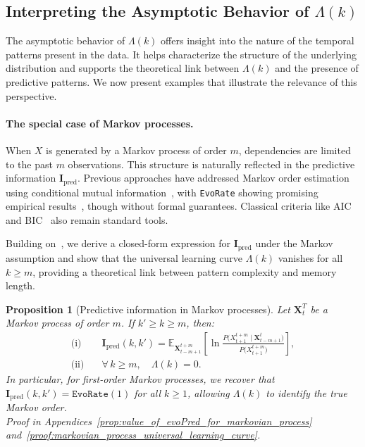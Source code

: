 \documentclass{article}
\newtheorem{proposition}[theorem]{Proposition}
\begin{document}
\subsection{Interpreting the Asymptotic Behavior of $\Lambda(k)$}

The asymptotic behavior of $\Lambda(k)$ offers insight into the nature of the temporal patterns present in the data. It helps characterize the structure of the underlying distribution and supports the theoretical link between $\Lambda(k)$ and the presence of predictive patterns. We now present examples that illustrate the relevance of this perspective.

\paragraph{The special case of Markov processes.}

When \( X \) is generated by a Markov process of order \( m \), dependencies are limited to the past \( m \) observations. This structure is naturally reflected in the predictive information \( \mathbf{I}_{\text{pred}} \). Previous approaches have addressed Markov order estimation using conditional mutual information~\cite{papapetrou2013markov}, with \texttt{EvoRate} showing promising empirical results~\cite{zeng2025towards}, though without formal guarantees. Classical criteria like AIC~\cite{katz1981some} and BIC~\cite{csiszar2000consistency} also remain standard tools.

Building on~\citet{crutchfield2003regularities}, we derive a closed-form expression for \( \mathbf{I}_{\text{pred}} \) under the Markov assumption and show that the universal learning curve \( \Lambda(k) \) vanishes for all \( k \geq m \), providing a theoretical link between pattern complexity and memory length.

\begin{proposition}[Predictive information in Markov processes]\label{prop:markov_combined}
Let $\mathbf{X}_{t}^{T}$ be a Markov process of order $m$. If $k' \geq k \geq m$, then:
\begin{align*}
  \text{(i)}\quad & \mathbf{I}_{\text{pred}}(k,k')
  = \mathbb{E}_{\mathbf{X}_{t-m+1}^{t+m}}
  \left[\ln\frac{P\bigl(X_{t+1}^{t+m}\mid\mathbf{X}_{t-m+1}^t\bigr)}
                {P\bigl(X_{t+1}^{t+m}\bigr)}\right], \\[6pt]
  \text{(ii)}\quad & \forall\,k\ge m,\quad \Lambda(k) = 0.
\end{align*}
In particular, for first-order Markov processes, we recover that $\mathbf{I}_{\text{pred}}(k, k') = \texttt{EvoRate}(1)$ for all $k \ge 1$, allowing $\Lambda(k)$ to identify the true Markov order.\\
\textit{Proof in Appendices~\ref{prop:value_of_evoPred_for_markovian_process} and~\ref{proof:markovian_process_universal_learning_curve}.}
\end{proposition}
\end{document}
